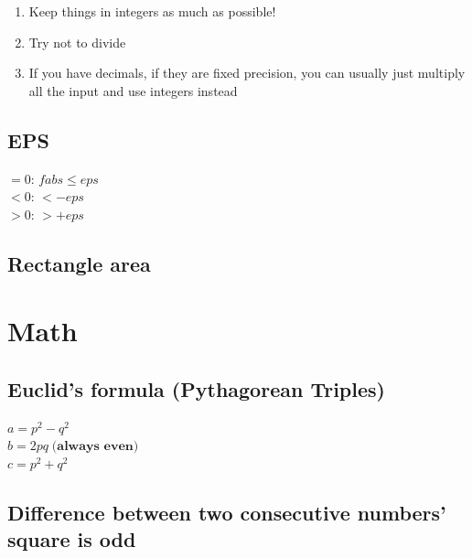 \documentclass[10pt,oneside]{article}
\begin{document}
\begin{landscape}
\begin{multicols}{2}
{\normalsize 
\begin{enumerate}
	\item Keep things in integers as much as possible!
	\item Try not to divide
	\item If you have decimals, if they are fixed precision, you can usually just multiply all the input and use integers instead
\end{enumerate}
}

\subsection{EPS}

{\normalsize 

$=0$: $fabs \leq eps$\\
$<0$: $ < -eps$\\
$>0$: $ > +eps$
}


\subsection{Rectangle area}

\section{Math}

\subsection{Euclid's formula (Pythagorean Triples)}

{\normalsize 
$a = p^2 - q^2 $\\
$b = 2pq \; \textbf{(always even)}$ \\
$c = p^2 + q^2$\\
}

\subsection{Difference between two consecutive numbers' square is odd}


\end{multicols}
\end{landscape}
\end{document}
